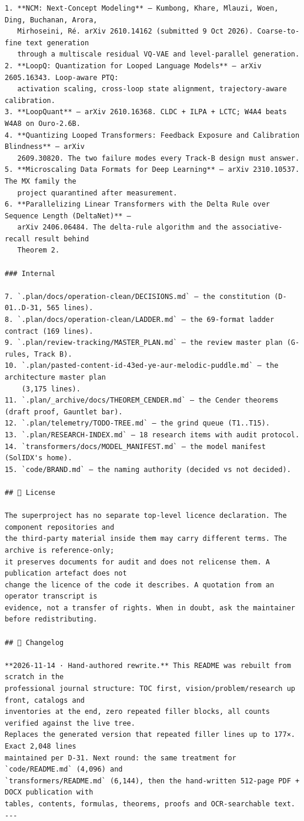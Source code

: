 \begin{Verbatim}[breaklines,breakanywhere,fontsize=\footnotesize]
1. **NCM: Next-Concept Modeling** — Kumbong, Khare, Mlauzi, Woen, Ding, Buchanan, Arora,
   Mirhoseini, Ré. arXiv 2610.14162 (submitted 9 Oct 2026). Coarse-to-fine text generation
   through a multiscale residual VQ-VAE and level-parallel generation.
2. **LoopQ: Quantization for Looped Language Models** — arXiv 2605.16343. Loop-aware PTQ:
   activation scaling, cross-loop state alignment, trajectory-aware calibration.
3. **LoopQuant** — arXiv 2610.16368. CLDC + ILPA + LCTC; W4A4 beats W4A8 on Ouro-2.6B.
4. **Quantizing Looped Transformers: Feedback Exposure and Calibration Blindness** — arXiv
   2609.30820. The two failure modes every Track-B design must answer.
5. **Microscaling Data Formats for Deep Learning** — arXiv 2310.10537. The MX family the
   project quarantined after measurement.
6. **Parallelizing Linear Transformers with the Delta Rule over Sequence Length (DeltaNet)** —
   arXiv 2406.06484. The delta-rule algorithm and the associative-recall result behind
   Theorem 2.

### Internal

7. `.plan/docs/operation-clean/DECISIONS.md` — the constitution (D-01..D-31, 565 lines).
8. `.plan/docs/operation-clean/LADDER.md` — the 69-format ladder contract (169 lines).
9. `.plan/review-tracking/MASTER_PLAN.md` — the review master plan (G-rules, Track B).
10. `.plan/pasted-content-id-43ed-ye-aur-melodic-puddle.md` — the architecture master plan
    (3,175 lines).
11. `.plan/_archive/docs/THEOREM_CENDER.md` — the Cender theorems (draft proof, Gauntlet bar).
12. `.plan/telemetry/TODO-TREE.md` — the grind queue (T1..T15).
13. `.plan/RESEARCH-INDEX.md` — 18 research items with audit protocol.
14. `transformers/docs/MODEL_MANIFEST.md` — the model manifest (SolIDX's home).
15. `code/BRAND.md` — the naming authority (decided vs not decided).

## 📜 License

The superproject has no separate top-level licence declaration. The component repositories and
the third-party material inside them may carry different terms. The archive is reference-only;
it preserves documents for audit and does not relicense them. A publication artefact does not
change the licence of the code it describes. A quotation from an operator transcript is
evidence, not a transfer of rights. When in doubt, ask the maintainer before redistributing.

## 📝 Changelog

**2026-11-14 · Hand-authored rewrite.** This README was rebuilt from scratch in the
professional journal structure: TOC first, vision/problem/research up front, catalogs and
inventories at the end, zero repeated filler blocks, all counts verified against the live tree.
Replaces the generated version that repeated filler lines up to 177×. Exact 2,048 lines
maintained per D-31. Next round: the same treatment for `code/README.md` (4,096) and
`transformers/README.md` (6,144), then the hand-written 512-page PDF + DOCX publication with
tables, contents, formulas, theorems, proofs and OCR-searchable text.
---


\end{Verbatim}
